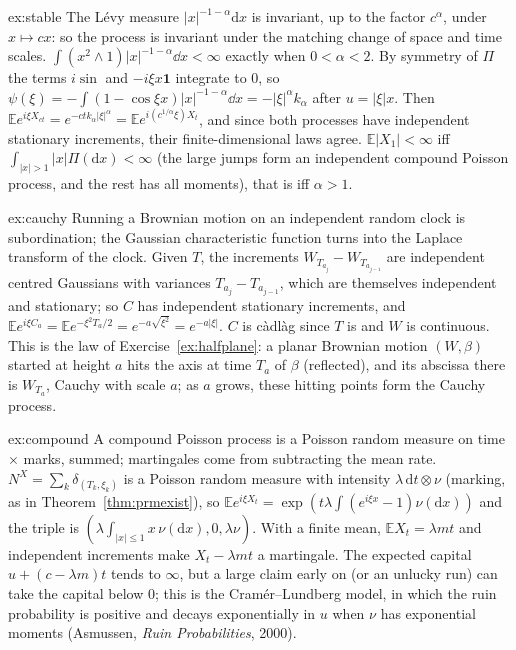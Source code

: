 \begin{solution}{ex:stable}
\idea The L\'evy measure $|x|^{-1-\alpha}\mathrm dx$ is invariant, up to the factor $c^{\alpha}$, under $x\mapsto cx$: so the process is invariant under the matching change of space and time scales.
\writeup $\int(x^2\wedge1)|x|^{-1-\alpha}\dd x<\infty$ exactly when $0<\alpha<2$. By symmetry of $\Pi$ the terms $i\sin$ and $-i\xi x\mathbf 1$ integrate to $0$, so $\psi(\xi)=-\int(1-\cos\xi x)|x|^{-1-\alpha}\dd x=-|\xi|^\alpha k_\alpha$
after $u=|\xi|x$. Then $\mathbb Ee^{i\xi X_{ct}}=e^{-ctk_\alpha|\xi|^\alpha}=\mathbb Ee^{i(c^{1/\alpha}\xi)X_t}$, and since both processes have independent stationary increments, their finite-dimensional laws agree. $\mathbb E|X_1|<\infty$
iff $\int_{|x|>1}|x|\Pi(\mathrm dx)<\infty$ (the large jumps form an independent compound Poisson process, and the rest has all moments), that is iff $\alpha>1$.
\end{solution}

\begin{solution}{ex:cauchy}
\idea Running a Brownian motion on an independent random clock is subordination; the Gaussian characteristic function turns into the Laplace transform of the clock.
\writeup Given $T$, the increments $W_{T_{a_j}}-W_{T_{a_{j-1}}}$ are independent centred Gaussians with variances $T_{a_j}-T_{a_{j-1}}$, which are themselves independent and stationary; so $C$ has independent stationary increments, and
$\mathbb Ee^{i\xi C_a}=\mathbb Ee^{-\xi^2T_a/2}=e^{-a\sqrt{\xi^2}}=e^{-a|\xi|}$. $C$ is c\`adl\`ag since $T$ is and $W$ is continuous. This is the law of Exercise~\ref{ex:halfplane}: a planar Brownian motion $(W,\beta)$ started at height
$a$ hits the axis at time $T_a$ of $\beta$ (reflected), and its abscissa there is $W_{T_a}$, Cauchy with scale $a$; as $a$ grows, these hitting points form the Cauchy process.
\end{solution}

\begin{solution}{ex:compound}
\idea A compound Poisson process is a Poisson random measure on time $\times$ marks, summed; martingales come from subtracting the mean rate.
\writeup $N^X=\sum_k\delta_{(T_k,\xi_k)}$ is a Poisson random measure with intensity $\lambda\,\mathrm dt\otimes\nu$ (marking, as in Theorem~\ref{thm:prmexist}), so $\mathbb Ee^{i\xi X_t}=\exp(t\lambda\int(e^{i\xi x}-1)\nu(\mathrm dx))$ and the triple is
$(\lambda\int_{|x|\le1}x\,\nu(\mathrm dx),0,\lambda\nu)$. With a finite mean, $\mathbb EX_t=\lambda mt$ and independent increments make $X_t-\lambda mt$ a martingale. The expected capital $u+(c-\lambda m)t$ tends to $\infty$, but a large claim
early on (or an unlucky run) can take the capital below $0$; this is the Cram\'er--Lundberg model, in which the ruin probability is positive and decays exponentially in $u$ when $\nu$ has exponential moments (Asmussen, \emph{Ruin
Probabilities}, 2000).
\end{solution}

